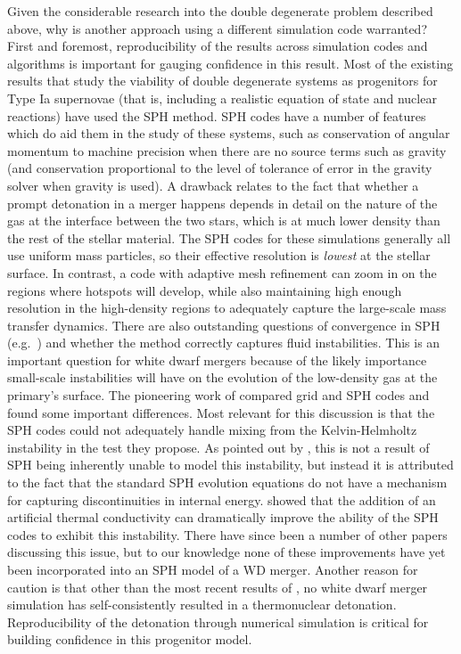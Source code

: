 \documentclass[iop,numberedappendix]{../emulateapj}
\begin{document}
Given the considerable research into the double degenerate problem 
described above, why is another approach using a different simulation
code warranted? First and foremost, reproducibility of the results
across simulation codes and algorithms is important for gauging
confidence in this result. Most of the existing results that study 
the viability of double degenerate systems as progenitors for
Type Ia supernovae (that is, including a realistic 
equation of state and nuclear reactions) have
used the SPH method. SPH codes have a number of features which do aid
them in the study of these systems, such as conservation of
angular momentum to machine precision when there are no source terms
such as gravity (and conservation proportional to the level of
tolerance of error in the gravity solver when gravity is used).
A drawback relates to the fact that whether a prompt detonation
in a merger happens depends in detail on the nature of the
gas at the interface between the two stars, which is at much lower
density than the rest of the stellar material. The SPH codes for these
simulations generally all use
uniform mass particles, so their effective resolution is
\textit{lowest} at the stellar surface. In contrast, a code
with adaptive mesh refinement can zoom in on the regions where
hotspots will develop, while also maintaining high enough resolution
in the high-density regions to adequately capture the large-scale mass
transfer dynamics. There are also outstanding questions of
convergence in SPH (e.g.\ \citealt{zhu_SPH:2014}) and whether the method
correctly captures fluid instabilities. This is an important question
for white dwarf mergers because of the likely importance small-scale
instabilities will have on the evolution of the low-density gas at the
primary's surface. The pioneering work of \cite{agertz:2007} compared
grid and SPH codes and found some important differences. Most relevant
for this discussion is that the SPH codes could not adequately handle
mixing from the Kelvin-Helmholtz instability in the test they
propose. As pointed out by \cite{price:2008}, this is not a result of
SPH being inherently unable to model this instability, but instead it
is attributed to the fact that the standard SPH evolution equations do
not have a mechanism for capturing discontinuities in internal
energy. \citeauthor{price:2008} showed that the addition of an
artificial thermal conductivity can dramatically improve the ability
of the SPH codes to exhibit this instability. There have since been a
number of other papers discussing this issue, but to our knowledge
none of these improvements have yet been incorporated into an SPH
model of a WD merger. Another reason for caution is that other than the
most recent results of \cite{kashyap:2015}, no white dwarf merger simulation has self-consistently
resulted in a thermonuclear detonation. Reproducibility of the detonation 
through numerical simulation is critical for building 
confidence in this progenitor model.
\end{document}
